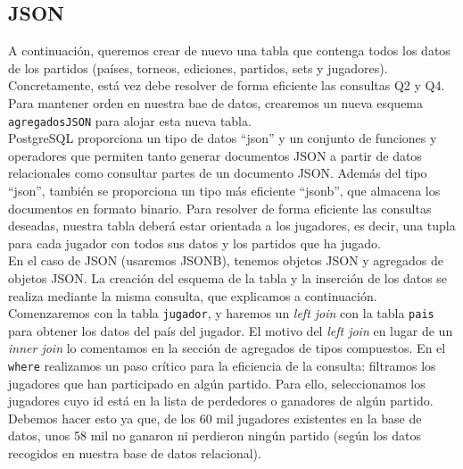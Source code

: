 \subsection{JSON}

A continuación, queremos crear de nuevo una tabla que contenga todos los datos de los partidos (países, torneos, ediciones, partidos, sets y jugadores). Concretamente, está vez debe resolver de forma eficiente las consultas Q2 y Q4. Para mantener orden en nuestra bae de datos, crearemos un nueva esquema \texttt{agregadosJSON} para alojar esta nueva tabla. \\

PostgreSQL proporciona un tipo de datos ``json'' y un conjunto de funciones y operadores que permiten tanto generar documentos JSON a partir de datos relacionales como consultar partes de un documento JSON. Además del tipo ``json'', también se proporciona un tipo más eficiente ``jsonb'', que almacena los documentos en formato binario. Para resolver de forma eficiente las consultas deseadas, nuestra tabla deberá estar orientada a los jugadores, es decir, una tupla para cada jugador con todos sus datos y los partidos que ha jugado. \\

En el caso de JSON (usaremos JSONB), tenemos objetos JSON y agregados de objetos JSON. La creación del esquema de la tabla y la inserción de los datos se realiza mediante la misma consulta, que explicamos a continuación.  \\


Comenzaremos con la tabla \texttt{jugador}, y haremos un \textit{left join} con la tabla \texttt{pais} para obtener los datos del país del jugador. El motivo del \textit{left join} en lugar de un \textit{inner join} lo comentamos en la sección de agregados de tipos compuestos. En el \texttt{where} realizamos un paso crítico para la eficiencia de la consulta: filtramos los jugadores que han participado en algún partido. Para ello, seleccionamos los jugadores cuyo id está en la lista de perdedores o ganadores de algún partido. Debemos hacer esto ya que, de los 60 mil jugadores existentes en la base de datos, unos 58 mil no ganaron ni perdieron ningún partido (según los datos recogidos en nuestra base de datos relacional). \\

